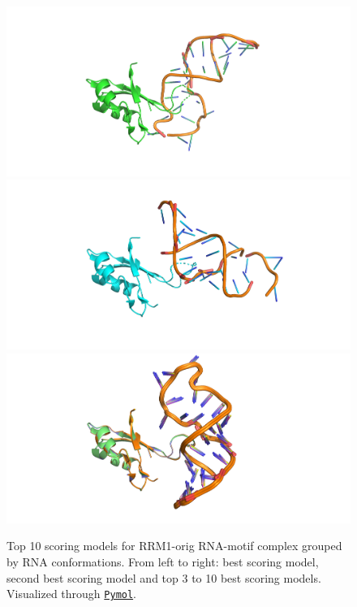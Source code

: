 \begin{figure}[htbp!]
    \includegraphics[trim={6.5cm 0 6.5cm 0},clip,width=\linewidth]{assets/RMM1_orig_top0.png}
\endminipage\hfill
{}
    \includegraphics[trim={6.5cm 0 5.5cm 0},clip,width=\linewidth]{assets/RMM1_orig_top1.png}
\endminipage\hfill
{}
    \includegraphics[trim={6.5cm 0 7cm 0},clip,width=\linewidth]{assets/RMM1_orig_2to8.png}
\endminipage
\caption[Top 10 scoring models for RRM1-orig RNA-motif complex grouped by RNA conformations.]{Top 10 scoring models for RRM1-orig RNA-motif complex grouped by RNA conformations. From left to right: best scoring model, second best scoring model and top 3 to 10 best scoring models. Visualized through \href{https://pymol.org/2/}{\texttt{Pymol}}.}
\label{fig:RRMorigSep}
\end{figure}


